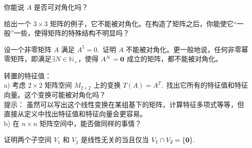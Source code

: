 \begin{problemset}
你能说 $A$ 是否可对角化吗？
\item \label{ex:04-02-11} 给出一个 $3 \times 3$ 矩阵的例子，它不能被对角化。在构造了矩阵之后，你能使它“一般”一些，使得矩阵的特殊结构不明显吗？
\item \label{ex:04-02-12} 设一个非零矩阵 $A$ 满足 $A^5 = 0$.~证明 $A$ 不能被对角化。更一般地说，任何非零幂零矩阵，即满足$\exists N \in \mathbb{N}_+$，使得  $A^N = \mathbf{0}$ 成立的矩阵，都不能被对角化。
\item \label{ex:04-02-13} 转置的特征值：
\\
a) 考虑 $2 \times 2$ 矩阵空间 $M_{2 \times 2}$ 上的变换 $T(A) = A^T$.~找出它所有的特征值和特征向量。这个变换可能被对角化吗？
\\
{\heiti 提示：} 虽然可以写出这个线性变换在某组基下的矩阵，计算特征多项式等等，但直接从定义中找出特征值和特征向量会更容易。
\\
b) 在 $n \times n$ 矩阵空间中，能否做同样的事情？
\item \label{ex:04-02-14} 证明两个子空间 $V_1$ 和 $V_2$ 是线性无关的当且仅当 $V_1 \cap V_2 = \{\mathbf{0}\}$.~
\end{problemset}




